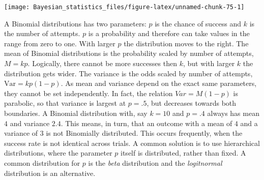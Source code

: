 \documentclass[]{svmono}
\newenvironment{Shaded}{\begin{snugshade}}{\end{snugshade}}
\newcommand{\KeywordTok}[1]{\textcolor[rgb]{0.13,0.29,0.53}{\textbf{#1}}}
\newcommand{\DataTypeTok}[1]{\textcolor[rgb]{0.13,0.29,0.53}{#1}}
\newcommand{\DecValTok}[1]{\textcolor[rgb]{0.00,0.00,0.81}{#1}}
\newcommand{\FloatTok}[1]{\textcolor[rgb]{0.00,0.00,0.81}{#1}}
\newcommand{\StringTok}[1]{\textcolor[rgb]{0.31,0.60,0.02}{#1}}
\newcommand{\OperatorTok}[1]{\textcolor[rgb]{0.81,0.36,0.00}{\textbf{#1}}}
\newcommand{\NormalTok}[1]{#1}
\begin{document}
\begin{Shaded}
\end{Shaded}

\texttt{[image: Bayesian\_statistics\_files/figure-latex/unnamed-chunk-75-1]}

A Binomial distributions has two parameters: \(p\) is the chance of
success and \(k\) is the number of attempts. \(p\) is a probability and
therefore can take values in the range from zero to one. With larger
\(p\) the distribution moves to the right. The mean of Binomial
distributions is the probability scaled by number of attempts,
\(M = kp\). Logically, there cannot be more successes then \(k\), but
with larger \(k\) the distribution gets wider. The variance is the odds
scaled by number of attempts, \(\textrm{Var} = kp(1-p)\). As mean and
variance depend on the exact same parameters, they cannot be set
independently. In fact, the relation \(Var = M(1-p)\) is parabolic, so
that variance is largest at \(p = .5\), but decreases towards both
boundaries. A Binomial distribution with, say \(k=10\) and \(p = .4\)
always has mean \(4\) and variance \(2.4\). This means, in turn, that an
outcome with a mean of \(4\) and a variance of \(3\) is not Binomially
distributed. This occurs frequently, when the success rate is not
identical across trials. A common solution is to use hierarchical
distributions, where the parameter \(p\) itself is distributed, rather
than fixed. A common distribution for \(p\) is the \emph{beta}
distribution and the \emph{logitnormal} distribution is an alternative.
\end{document}
